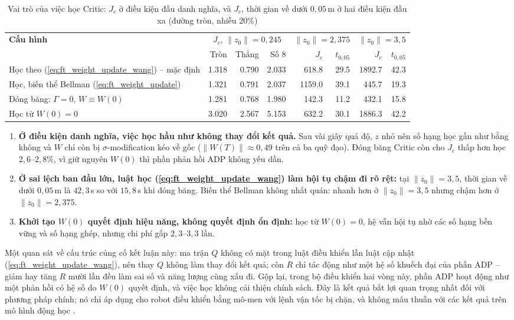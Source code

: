 \documentclass[12pt,a4paper]{article}
\begin{document}
\begin{table}[H]
\centering
\caption{Vai trò của việc học Critic: $J_c$ ở điều kiện đầu danh nghĩa, và $J_c$, thời gian về dưới $0{,}05$\,m ở hai điều kiện đầu xa (đường tròn, nhiễu 20\%)}
\label{tab:critic_role}
\scriptsize
\begin{tabular}{lrrrrrrr}
\toprule
\multirow{2}{*}{\textbf{Cấu hình}} & \multicolumn{3}{c}{$J_c$, $\|z_0\| = 0{,}245$} & \multicolumn{2}{c}{$\|z_0\| = 2{,}375$} & \multicolumn{2}{c}{$\|z_0\| = 3{,}5$} \\
\cmidrule(lr){2-4}\cmidrule(lr){5-6}\cmidrule(lr){7-8}
 & Tròn & Thẳng & Số 8 & $J_c$ & $t_{0,05}$ & $J_c$ & $t_{0,05}$ \\
\midrule
Học theo (\ref{eq:ft_weight_update_wang}) -- mặc định & 1.318 & 0.790 & 2.033 & 618.8 & 29.5 & 1892.7 & 42.3 \\
Học, biến thể Bellman (\ref{eq:ft_weight_update}) & 1.321 & 0.791 & 2.037 & 1159.0 & 39.1 & 445.7 & 19.3 \\
Đóng băng: $\Gamma = 0$, $W \equiv W(0)$ & 1.281 & 0.768 & 1.980 & 142.3 & 11.2 & 432.1 & 15.8 \\
Học từ $W(0) = 0$ & 3.020 & 2.567 & 5.153 & 632.2 & 30.1 & 1886.3 & 42.2 \\
\bottomrule
\end{tabular}
\end{table}

\begin{enumerate}
    \item \textbf{Ở điều kiện danh nghĩa, việc học hầu như không thay đổi kết quả.} Sau vài giây quá độ, $z$ nhỏ nên số hạng học gần như bằng không và $W$ chỉ còn bị $\sigma$-modification kéo về gốc ($\|W(T)\| \approx 0{,}49$ trên cả ba quỹ đạo). Đóng băng Critic còn cho $J_c$ thấp hơn học $2{,}6$--$2{,}8\%$, vì giữ nguyên $W(0)$ thì phần phản hồi ADP không yếu dần.
    \item \textbf{Ở sai lệch ban đầu lớn, luật học (\ref{eq:ft_weight_update_wang}) làm hội tụ chậm đi rõ rệt:} tại $\|z_0\| = 3{,}5$, thời gian về dưới $0{,}05$\,m là $42{,}3$\,s so với $15{,}8$\,s khi đóng băng. Biến thể Bellman không nhất quán: nhanh hơn ở $\|z_0\| = 3{,}5$ nhưng chậm hơn ở $\|z_0\| = 2{,}375$.
    \item \textbf{Khởi tạo $W(0)$ quyết định hiệu năng, không quyết định ổn định:} học từ $W(0) = 0$, hệ vẫn hội tụ nhờ các số hạng bền vững và số hạng ghép, nhưng chi phí gấp $2{,}3$--$3{,}3$ lần.
\end{enumerate}
Một quan sát về cấu trúc củng cố kết luận này: ma trận $Q$ không có mặt trong luật điều khiển lẫn luật cập nhật (\ref{eq:ft_weight_update_wang}), nên thay $Q$ không làm thay đổi kết quả; còn $R$ chỉ tác động như một hệ số khuếch đại của phần ADP -- giảm hay tăng $R$ mười lần đều làm sai số và năng lượng cùng xấu đi. Gộp lại, trong bộ điều khiển hai vòng này, phần ADP hoạt động như một phản hồi có hệ số do $W(0)$ quyết định, và việc học không cải thiện chính sách. Đây là kết quả bất lợi quan trọng nhất đối với phương pháp chính; nó chỉ áp dụng cho robot điều khiển bằng mô-men với lệnh vận tốc bị chặn, và không mâu thuẫn với các kết quả trên mô hình động học \cite{Wang2025}.
\end{document}
